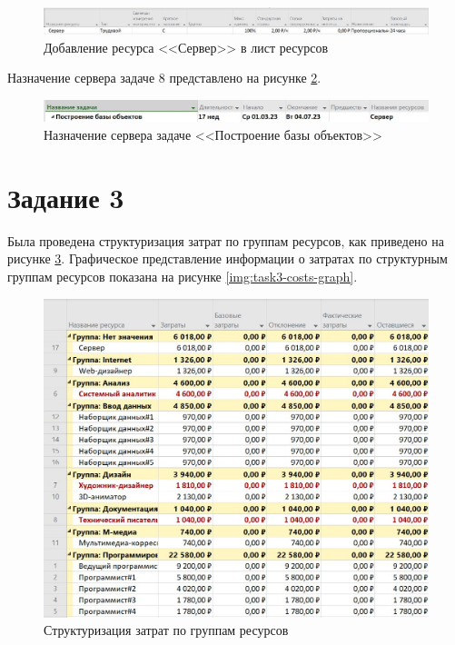 \begin{figure}[H]
	\begin{center}
		\includegraphics[scale=0.5]{inc/img/task2-server.jpg}
	\end{center}
	\captionsetup{justification=centering}
	\caption{Добавление ресурса <<Сервер>> в лист ресурсов}
	\label{img:task2-server}
\end{figure}

Назначение сервера задаче 8 представлено на рисунке \ref{img:task2-assignment}.

\begin{figure}[H]
	\begin{center}
		\includegraphics[scale=0.5]{inc/img/task2-assignment.jpg}
	\end{center}
	\captionsetup{justification=centering}
	\caption{Назначение сервера задаче <<Построение базы объектов>>}
	\label{img:task2-assignment}
\end{figure}

\section*{Задание 3}

Была проведена структуризация затрат по группам ресурсов, как приведено на рисунке \ref{img:task3-costs}. Графическое представление информации о затратах по структурным группам ресурсов показана на рисунке \ref{img:task3-costs-graph}.

\begin{figure}[H]
	\begin{center}
		\includegraphics[scale=0.4]{inc/img/task3-costs.jpg}
	\end{center}
	\captionsetup{justification=centering}
	\caption{Структуризация затрат по группам ресурсов}
	\label{img:task3-costs}
\end{figure}

